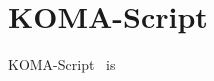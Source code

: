 \documentclass[master.tex]{subfiles}
\begin{document}
\chapter{KOMA-Script}

KOMA-Script~\cite{komascript} is 
\end{document}
